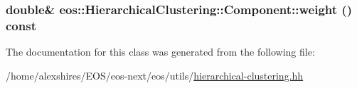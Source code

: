 \label{classeos_1_1HierarchicalClustering_1_1Component_af164b5ba0a2ba3b3792a21fb284bb119}
\hypertarget{classeos_1_1HierarchicalClustering_1_1Component_a18b8d0c7a2fd0b9b6b15647803424564}{
\subsubsection[{weight}]{\setlength{\rightskip}{0pt plus 5cm}double\& eos::HierarchicalClustering::Component::weight () const}}
\label{classeos_1_1HierarchicalClustering_1_1Component_a18b8d0c7a2fd0b9b6b15647803424564}


The documentation for this class was generated from the following file:\begin{DoxyCompactItemize}
\item 
/home/alexshires/EOS/eos-\/next/eos/utils/\hyperlink{hierarchical-clustering_8hh}{hierarchical-\/clustering.hh}\end{DoxyCompactItemize}
